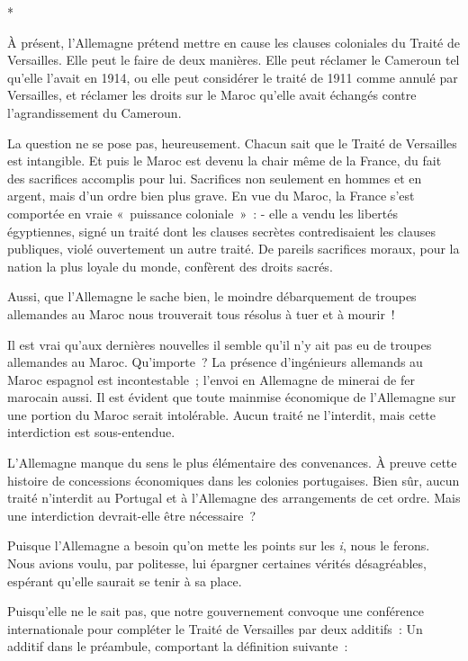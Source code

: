 \documentclass[french,twoside]{book} %
\begin{document}
\begin{center}
*\end{center}
\noindent \par
À présent, l'Allemagne prétend mettre en cause les clauses coloniales du Traité de Versailles. Elle peut le faire de deux manières. Elle peut réclamer le Cameroun tel qu'elle l'avait en 1914, ou elle peut considérer le traité de 1911 comme annulé par Versailles, et réclamer les droits sur le Maroc qu'elle avait échangés contre l'agrandissement du Cameroun.\par
La question ne se pose pas, heureusement. Chacun sait que le Traité de Versailles est intangible. Et puis le Maroc est devenu la chair même de la France, du fait des sacrifices accomplis pour lui. Sacrifices non seulement en hommes et en argent, mais d'un ordre bien plus grave. En vue du Maroc, la France s'est comportée en vraie « puissance coloniale » : - elle a vendu les libertés égyptiennes, signé un traité dont les clauses secrètes contredisaient les clauses publiques, violé ouvertement un autre traité. De pareils sacrifices moraux, pour la nation la plus loyale du monde, confèrent des droits sacrés.\par
Aussi, que l'Allemagne le sache bien, le moindre débarquement de troupes allemandes au Maroc nous trouverait tous résolus à tuer et à mourir !\par
Il est vrai qu'aux dernières nouvelles il semble qu'il n'y ait pas eu de troupes allemandes au Maroc. Qu'importe ? La présence d'ingénieurs allemands au Maroc espagnol est incontestable ; l'envoi en Allemagne de minerai de fer marocain aussi. Il est évident que toute mainmise économique de l'Allemagne sur une portion du Maroc serait intolérable. Aucun traité ne l'interdit, mais cette interdiction est sous-entendue.\par
L'Allemagne manque du sens le plus élémentaire des convenances. À preuve cette histoire de concessions économiques dans les colonies portu­gaises. Bien sûr, aucun traité n'interdit au Portugal et à l'Allemagne des arrangements de cet ordre. Mais une interdiction devrait-elle être nécessaire ?\par
Puisque l'Allemagne a besoin qu'on mette les points sur les {\itshape i}, nous le ferons. Nous avions voulu, par politesse, lui épargner certaines vérités désagréables, espérant qu'elle saurait se tenir à sa place.\par
Puisqu'elle ne le sait pas, que notre gouvernement convoque une confé­rence internationale pour compléter le Traité de Versailles par deux additifs : Un additif dans le préambule, comportant la définition suivante :\par
\end{document}

